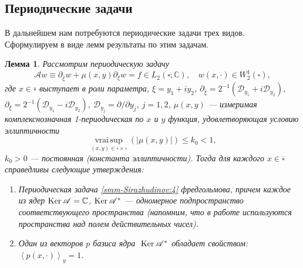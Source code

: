 \documentclass[a4paper,12pt]{article}
\newtheorem{lemma}[theorem]{Лемма}
\theoremstyle{definition}
\begin{document}
	\subsection{Периодические задачи}
	В дальнейшем нам потребуются периодические задачи трех видов. Сформулируем в виде   лемм  результаты по этим задачам.
	\begin{lemma}
		Рассмотрим периодическую задачу
		\begin{equation}\label{smm-Sirazhudinov:4}
			\mathscr{A}w\equiv\partial_{\bar{\xi}}w+\mu(x,y)\partial_\xi w=f\in L_2 (\square;\mathbb{C}),\quad w(x,\cdot)
			\in W_2^1 (\square),
		\end{equation}
		где $x\in \overline{\square}$ выступает в роли параметра, $\xi=y_1+iy_2$,
		$\partial_{\bar{\xi}}=2^{-1}(\mathscr{D}_{y_1}+i\mathscr{D}_{y_2})$,
		$\partial_\xi=2^{-1}(\mathscr{D}_{y_1}-i\mathscr{D}_{y_2})$,
		$\mathscr{D}_{y_j}=\partial/\partial y_j$, $j=1,2$,
		$\mu(x,y)$ --- измеримая комплекснозначная 1-периодическая по $x$ и $y$ функция, удовлетворяющая условию эллиптичности
		\begin{equation}\label{smm-Sirazhudinov:5}
			\mathop{\mathrm{vrai\, sup}}\limits_{(x,y)\in\overline\square\times\square} (|\mu(x,y)|)     \leqslant k_0<1,
		\end{equation}
		$k_0>0$ --- постоянная {\rm(}константа эллиптичности{\rm)}.
		Тогда для  каждого $x\in \overline\square$ справедливы следующие утверждения:
		\begin{enumerate}
			\item[1)]       Периодическая задача \eqref{smm-Sirazhudinov:4} фредгольмова, причем каждое из ядер $\text{Ker\,}\mathscr{A}=\mathbb{C}$, $\text{Ker\,}\mathscr{A}^\ast$ --- одномерное подпространство соответствующего пространства {\rm(}напомним,
			что в работе используются пространства над полем действительных чисел{\rm)}.
			\item[2)] Один из векторов $p$ базиса ядра $\text{ Ker\,}\mathscr{A}^\ast$ обладает свойством: $\left\langle p(x,\cdot)\right\rangle_y=1$.
		\end{enumerate}
	\end{lemma}
\end{document}

